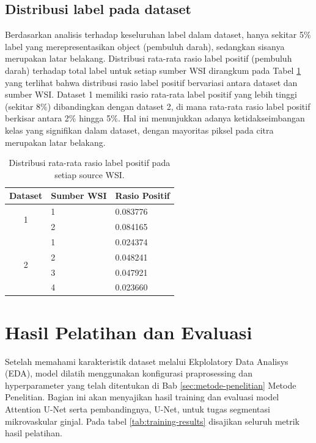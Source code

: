 \subsection{Distribusi label pada dataset}
\noindent Berdasarkan analisis terhadap keseluruhan label dalam dataset, hanya sekitar 5$\%$ label yang merepresentasikan object (pembuluh darah), sedangkan sisanya merupakan latar belakang. Distribusi rata-rata rasio label positif (pembuluh darah) terhadap total label untuk setiap sumber WSI dirangkum pada Tabel \ref{tab:distribusi_label} yang terlihat bahwa distribusi rasio label positif bervariasi antara dataset dan sumber WSI. Dataset 1 memiliki rasio rata-rata label positif yang lebih tinggi (sekitar 8$\%$) dibandingkan dengan dataset 2, di mana rata-rata rasio label positif berkisar antara 2$\%$ hingga 5$\%$. Hal ini menunjukkan adanya ketidakseimbangan kelas yang signifikan dalam dataset, dengan mayoritas piksel pada citra merupakan latar belakang.

\begin{table}[H]
	\centering
	\caption{Distribusi rata-rata rasio label positif pada setiap source WSI.}
	\label{tab:distribusi_label}
	\begin{tabular}{cll}
		\hline
		\multicolumn{1}{l}{Dataset} & Sumber WSI & Rasio Positif \\ \hline
		\multirow{2}{*}{1}          & 1          & 0.083776      \\
		& 2          & 0.084165       \\ \hline
		\multirow{4}{*}{2}          & 1          & 0.024374       \\
		& 2          & 0.048241       \\
		& 3          & 0.047921       \\
		& 4          & 0.023660       \\ \hline
	\end{tabular}
\end{table}


\section{Hasil Pelatihan dan Evaluasi}
\noindent Setelah memahami karakteristik dataset melalui Ekplolatory Data Analisys (EDA), model dilatih menggunakan konfigurasi praprosessing dan hyperparameter yang telah ditentukan di Bab \ref{sec:metode-penelitian} Metode Penelitian. Bagian ini akan menyajikan hasil training dan evaluasi model Attention U-Net serta pembandingnya, U-Net, untuk tugas segmentasi mikrovaskular ginjal. Pada tabel \ref{tab:training-results} disajikan seluruh metrik hasil pelatihan.



